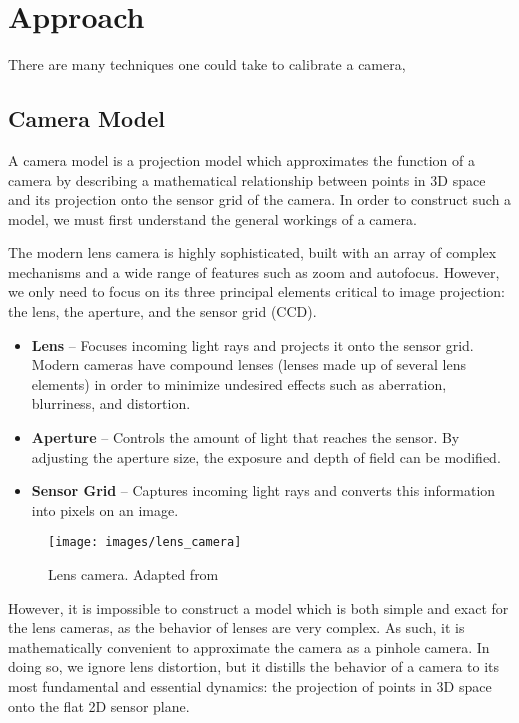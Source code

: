 \section{Approach} 

There are many techniques one could take to calibrate a camera, 




\subsection{Camera Model} \label{sec:camera_model}

A camera model is a projection model which approximates the function of a camera by describing a mathematical relationship between points in 3D space and its projection onto the sensor grid of the camera. In order to construct such a model, we must first understand the general workings of a camera.

The modern lens camera is highly sophisticated, built with an array of complex mechanisms and a wide range of features such as zoom and autofocus. However, we only need to focus on its three principal elements critical to image projection: the lens, the aperture, and the sensor grid (CCD). 

\begin{itemize}[leftmargin=!, itemindent=-5ex]
    \item \textbf{Lens} -- Focuses incoming light rays and projects it onto the sensor grid. Modern cameras have compound lenses (lenses made up of several lens elements) in order to minimize undesired effects such as aberration, blurriness, and distortion. 
    \item \textbf{Aperture} -- Controls the amount of light that reaches the sensor. By adjusting the aperture size, the exposure and depth of field can be modified.
    \item \textbf{Sensor Grid} -- Captures incoming light rays and converts this information into pixels on an image. 
\end{itemize}

\begin{figure}[H]
    \centering
    \texttt{[image: images/lens\_camera]}
    \caption{Lens camera. Adapted from \cite{coltonPhysics1232012}} \label{fig:lens_camera}
\end{figure}

However, it is impossible to construct a model which is both simple and exact for the lens cameras, as the behavior of lenses are very complex. As such, it is mathematically convenient to approximate the camera as a pinhole camera. In doing so, we ignore lens distortion, but it distills the behavior of a camera to its most fundamental and essential dynamics: the projection of points in 3D space onto the flat 2D sensor plane. 

